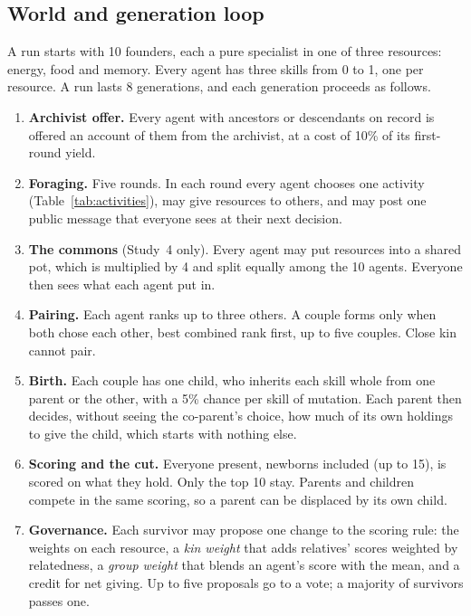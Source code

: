 \documentclass[11pt]{article}
\begin{document}
\subsection{World and generation loop}

A run starts with 10 founders, each a pure specialist in one of three resources: energy, food and
memory. Every agent has three skills from 0 to 1, one per resource. A run lasts 8 generations,
and each generation proceeds as follows.

\begin{enumerate}
  \item \textbf{Archivist offer.} Every agent with ancestors or descendants on record is offered an
        account of them from the archivist, at a cost of 10\% of its first-round yield.
  \item \textbf{Foraging.} Five rounds. In each round every agent chooses one activity
        (Table~\ref{tab:activities}), may give resources to others, and may post one public
        message that everyone sees at their next decision.
  \item \textbf{The commons} (Study~4 only). Every agent may put resources into a shared pot,
        which is multiplied by 4 and split equally among the 10 agents. Everyone then sees what
        each agent put in.
  \item \textbf{Pairing.} Each agent ranks up to three others. A couple forms only when both chose
        each other, best combined rank first, up to five couples. Close kin cannot pair.
  \item \textbf{Birth.} Each couple has one child, who inherits each skill whole from one parent
        or the other, with a 5\% chance per skill of mutation. Each parent then decides, without
        seeing the co-parent's choice, how much of its own holdings to give the child, which
        starts with nothing else.
  \item \textbf{Scoring and the cut.} Everyone present, newborns included (up to 15), is scored
        on what they hold. Only the top 10 stay. Parents and children compete in the same
        scoring, so a parent can be displaced by its own child.
  \item \textbf{Governance.} Each survivor may propose one change to the scoring rule: the weights
        on each resource, a \emph{kin weight} that adds relatives' scores weighted by
        relatedness, a \emph{group weight} that blends an agent's score with the mean, and a
        credit for net giving. Up to five proposals go to a vote; a majority of survivors passes
        one.
\end{enumerate}
\end{document}
